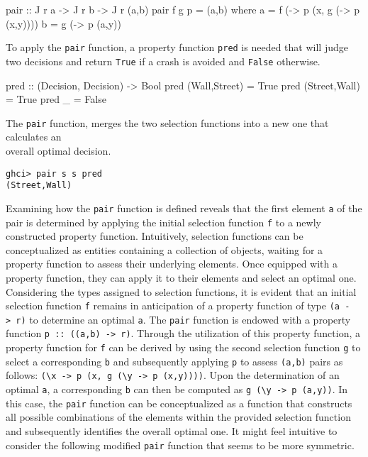 \documentclass[runningheads]{llncs}
\begin{document}
\begin{code}
pair :: J r a -> J r b -> J r (a,b)
pair f g p = (a,b)
  where
      a = f (\x -> p (x, g (\y -> p (x,y))))
      b = g (\y -> p (a,y))
\end{code}

To apply the \texttt{pair} function, a property function \texttt{pred}
is needed that will judge two decisions and return \texttt{True} if a
crash is avoided and \texttt{False} otherwise.

\begin{code}
pred :: (Decision, Decision) -> Bool
pred (Wall,Street) = True
pred (Street,Wall) = True
pred _             = False
\end{code}

The \texttt{pair} function, merges the two selection functions into a
new one that calculates an\\
overall optimal decision.

\begin{verbatim}
ghci> pair s s pred
(Street,Wall)
\end{verbatim}

Examining how the \texttt{pair} function is defined reveals that the
first element \texttt{a} of the pair is determined by applying the
initial selection function \texttt{f} to a newly constructed property
function. Intuitively, selection functions can be conceptualized as
entities containing a collection of objects, waiting for a property
function to assess their underlying elements. Once equipped with a
property function, they can apply it to their elements and select an
optimal one. Considering the types assigned to selection functions, it
is evident that an initial selection function \texttt{f} remains in
anticipation of a property function of type
\texttt{(a\ -\textgreater{}\ r)} to determine an optimal \texttt{a}. The
\texttt{pair} function is endowed with a property function
\texttt{p\ ::\ ((a,b)\ -\textgreater{}\ r)}. Through the utilization of
this property function, a property function for \texttt{f} can be
derived by using the second selection function \texttt{g} to select a
corresponding \texttt{b} and subsequently applying \texttt{p} to assess
\texttt{(a,b)} pairs as follows:
\texttt{(\textbackslash{}x\ -\textgreater{}\ p\ (x,\ g\ (\textbackslash{}y\ -\textgreater{}\ p\ (x,y))))}.
Upon the determination of an optimal \texttt{a}, a corresponding
\texttt{b} can then be computed as
\texttt{g\ (\textbackslash{}y\ -\textgreater{}\ p\ (a,y))}. In this
case, the \texttt{pair} function can be conceptualized as a function
that constructs all possible combinations of the elements within the
provided selection function and subsequently identifies the overall
optimal one. It might feel intuitive to consider the following modified
\texttt{pair} function that seems to be more symmetric.
\end{document}
